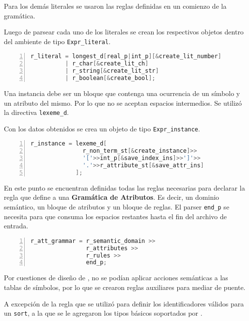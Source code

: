 Para los demás literales se usaron las reglas definidas en un comienzo de la gramática.

Luego de parsear cada uno de los literales se crean los respectivos objetos dentro del ambiente de tipo \texttt{Expr\_literal}.

\begin{lstlisting}[language=C++, basicstyle=\scriptsize, numbers=left, numbersep=5pt, numberstyle=\tiny]
r_literal = longest_d[real_p|int_p][&create_lit_number]
          | r_char[&create_lit_ch]
          | r_string[&create_lit_str]
          | r_boolean[&create_bool];
\end{lstlisting}

Una instancia debe ser un bloque que contenga una ocurrencia de un símbolo y un atributo del mismo. Por lo que no se aceptan espacios intermedios. Se utilizó la directiva \texttt{lexeme\_d}.

Con los datos obtenidos se crea un objeto de tipo \texttt{Expr\_instance}.

\begin{lstlisting}[language=C++, basicstyle=\scriptsize, numbers=left, numbersep=5pt, numberstyle=\tiny]
r_instance = lexeme_d[
               r_non_term_st[&create_instance]>>
               '['>>int_p[&save_index_ins]>>']'>>
               '.'>>r_attribute_st[&save_attr_ins]
             ];
\end{lstlisting}

En este punto se encuentran definidas todas las reglas necesarias para declarar la regla que define a una \textbf{Gramática de Atributos}. Es decir, un dominio semántico, un bloque de atributos y un bloque de reglas. El parser \texttt{end\_p} se necesita para que consuma los espacios restantes hasta el fin del archivo de entrada.

\begin{lstlisting}[language=C++, basicstyle=\scriptsize, numbers=left, numbersep=5pt, numberstyle=\tiny]
r_att_grammar = r_semantic_domain >>
                r_attributes >>
                r_rules >>
                end_p;
\end{lstlisting}

Por cuestiones de diseño de \spirit, no se podían aplicar acciones semánticas a las tablas de símbolos, por lo que se crearon reglas auxiliares para mediar de puente.

A excepción de la regla que se utilizó para definir los identificadores válidos para un \texttt{sort}, a la que se le agregaron los tipos básicos soportados por \maggen.

